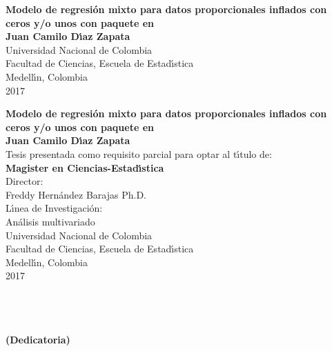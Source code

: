 \begin{center}
\begin{figure}
\centering%
%
\end{figure}
\thispagestyle{empty} \vspace*{2.0cm} \textbf{\huge
Modelo de regresi\'{o}n mixto para datos proporcionales inflados con ceros y/o unos con paquete en }\\[5.5cm]
\Large\textbf{Juan Camilo D\'{\i}az Zapata}\\[5.5cm]
\small Universidad Nacional de Colombia\\
Facultad de Ciencias, Escuela de Estad\'{\i}stica\\
Medell\'{\i}n, Colombia\\
2017\\
\end{center}

\newpage{\pagestyle{empty}\cleardoublepage}

\newpage
\begin{center}
\thispagestyle{empty} \vspace*{0cm} \textbf{\huge
Modelo de regresi\'{o}n mixto para datos proporcionales inflados con ceros y/o unos con paquete en }\\[3.0cm]
\Large\textbf{Juan Camilo D\'{\i}az Zapata}\\[3.0cm]
\small Tesis presentada como requisito parcial para optar al
t\'{\i}tulo de:\\
\textbf{Magister en Ciencias-Estad\'{\i}stica}\\[2.5cm]
Director:\\
Freddy Hern\'{a}ndez Barajas Ph.D.\\[2.0cm]
L\'{\i}nea de Investigaci\'{o}n:\\
An\'{a}lisis multivariado\\[2.5cm]
Universidad Nacional de Colombia\\
Facultad de Ciencias, Escuela de Estad\'{\i}stica\\
Medell\'{\i}n, Colombia\\
2017\\
\end{center}

\newpage{\pagestyle{empty}\cleardoublepage}

\newpage
\thispagestyle{empty} \textbf{}\normalsize
\\\\\\%
\textbf{(Dedicatoria)}\\[4.0cm]

